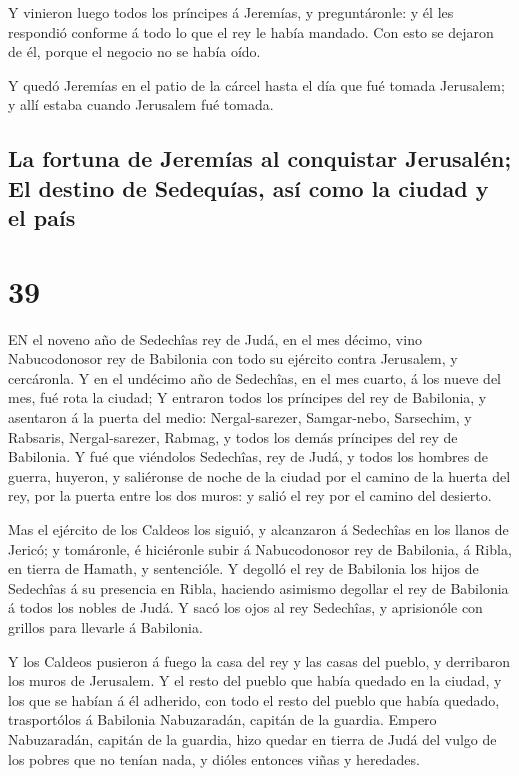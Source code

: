  Y vinieron luego todos los príncipes á Jeremías, y
preguntáronle: y él les respondió conforme á todo lo que el rey le había
mandado. Con esto se dejaron de él, porque el negocio no se había oído.

 Y quedó Jeremías en el patio de la cárcel hasta el día que
fué tomada Jerusalem; y allí estaba cuando Jerusalem fué tomada.

\hypertarget{la-fortuna-de-jeremuxedas-al-conquistar-jerusaluxe9n-el-destino-de-sedequuxedas-asuxed-como-la-ciudad-y-el-pauxeds}{%
\subsection{La fortuna de Jeremías al conquistar Jerusalén; El destino
de Sedequías, así como la ciudad y el
país}\label{la-fortuna-de-jeremuxedas-al-conquistar-jerusaluxe9n-el-destino-de-sedequuxedas-asuxed-como-la-ciudad-y-el-pauxeds}}

\hypertarget{section-38}{%
\section{39}\label{section-38}}

 EN el noveno año de Sedechîas rey de Judá, en el mes
décimo, vino Nabucodonosor rey de Babilonia con todo su ejército contra
Jerusalem, y cercáronla.  Y en el undécimo año de Sedechîas,
en el mes cuarto, á los nueve del mes, fué rota la ciudad; 
Y entraron todos los príncipes del rey de Babilonia, y asentaron á la
puerta del medio: Nergal-sarezer, Samgar-nebo, Sarsechim, y Rabsaris,
Nergal-sarezer, Rabmag, y todos los demás príncipes del rey de
Babilonia.  Y fué que viéndolos Sedechîas, rey de Judá, y
todos los hombres de guerra, huyeron, y saliéronse de noche de la ciudad
por el camino de la huerta del rey, por la puerta entre los dos muros: y
salió el rey por el camino del desierto.

 Mas el ejército de los Caldeos los siguió, y alcanzaron á
Sedechîas en los llanos de Jericó; y tomáronle, é hiciéronle subir á
Nabucodonosor rey de Babilonia, á Ribla, en tierra de Hamath, y
sentencióle.  Y degolló el rey de Babilonia los hijos de
Sedechîas á su presencia en Ribla, haciendo asimismo degollar el rey de
Babilonia á todos los nobles de Judá.  Y sacó los ojos al
rey Sedechîas, y aprisionóle con grillos para llevarle á Babilonia.

 Y los Caldeos pusieron á fuego la casa del rey y las casas
del pueblo, y derribaron los muros de Jerusalem.  Y el resto
del pueblo que había quedado en la ciudad, y los que se habían á él
adherido, con todo el resto del pueblo que había quedado, trasportólos á
Babilonia Nabuzaradán, capitán de la guardia.  Empero
Nabuzaradán, capitán de la guardia, hizo quedar en tierra de Judá del
vulgo de los pobres que no tenían nada, y dióles entonces viñas y
heredades.


